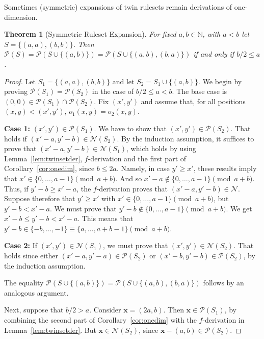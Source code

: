 \documentclass{amsart}
\theoremstyle{plain}
\newtheorem{thm}{Theorem}%
\theoremstyle{definition}
\newcommand{\N}{\ensuremath{\mathcal N}}
\renewcommand{\P}{\ensuremath{\mathcal P}}
\newcommand{\n}{\mathbb N}
\newcommand{\x}{\boldsymbol x}
\renewcommand{\ge}{\geqslant}
\renewcommand{\le}{\leqslant}
\begin{document}
Sometimes (symmetric) expansions of twin rulesets remain derivations of {\sc one-dimension}.   
\begin{thm}[Symmetric Ruleset Expansion]
\label{thm:twinadjoin}
    For fixed $a,b\in \n$, with $a<b$ let $S=\{(a,a),(b,b)\}$. Then $\P(S)=\P(S\cup\{(a,b)\})=\P(S\cup\{(a,b),(b,a)\})$ if and only if $ b/2\le a$. 
\end{thm}
\begin{proof}
Let $S_1=\{(a,a),(b,b)\}$ and let $S_2= S_1 \cup \{(a,b)\}$. We begin by proving  $\P(S_1)=\P(S_2)$ in the case of $b/2 \le a < b $. The base case  is  $(0,0) \in \P(S_1) \cap \P(S_2)$. Fix $(x', y')$ and 
assume that, for  all positions $(x ,y)<(x', y')$,  $o_1(x , y)=  o_2(x , y)$.\vspace{2 mm}

\noindent \textbf{Case 1:} $(x', y') \in \P(S_1)$. We have to show that $ ( x', y')\in \P(S_2)$. That holds if $(x'-a, y'-b)\in \N(S_2)$. By the induction assumption, it suffices to prove that $(x'-a, y'-b)\in \N(S_1)$, which holds by using Lemma~\ref{lem:twinsetder}, $f$-derivation and the first part of Corollary~\ref{cor:onedim}, since $b\le 2a$. Namely, in case $y'\ge x'$, these results imply that $x'\in \{0,\ldots , a-1\} \pmod{a+b}$. And so $x'-a\not\in \{0,\ldots , a-1\} \pmod{a+b}$. Thus, if $y'-b\ge x'-a$, the $f$-derivation proves that $(x'-a,y'-b)\in \N$. Suppose therefore that $y'\ge x'$ with $x'\in \{0,\ldots , a-1\} \pmod{a+b}$, but $y'-b < x'-a$. We must prove that $y'-b\not\in \{0,\ldots , a-1\} \pmod{a+b}$. We get $x'-b\le y'-b < x'-a$. This means that $y'-b\in \{-b,\ldots , -1\}\equiv \{a,\ldots , a+b-1\} \pmod{a+b}$.\vspace{2 mm}

 \noindent \textbf{Case 2:} If $(x', y') \in \N(S_1)$,   we must prove that $ ( x', y')\in \N(S_2)$. That holds since either $(x'-a, y'-a)\in \P(S_2)$ or $(x'-b, y'-b)\in \P(S_2)$, by the induction assumption. \vspace{2 mm}

The equality $\P(S\cup\{(a,b)\})=\P(S\cup\{(a,b),(b,a)\})$ follows by an analogous argument.

Next, suppose that $b/2 > a$. Consider $\x=(2a,b)$. Then $\x\in\P(S_1)$, by combining the second part of Corollary~\ref{cor:onedim} with the $f$-derivation in Lemma~\ref{lem:twinsetder}. But $\x\in\N(S_2)$, since $\x-(a,b)\in\P(S_2)$. 
\end{proof}
\end{document}

